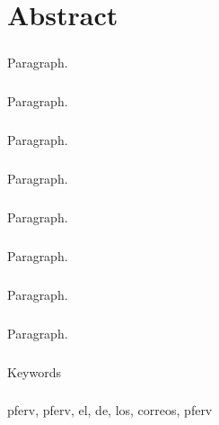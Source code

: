 \chapter*{Abstract}
\label{cha:abstract}
\paragraph{}
Paragraph.

\paragraph{}
Paragraph.

\paragraph{}
Paragraph.

\paragraph{}
Paragraph.

\newpage %

\paragraph{}
Paragraph.

\paragraph{}
Paragraph.

\paragraph{}
Paragraph.


\paragraph{}
Paragraph.

\newpage %
\paragraph{}
{\huge Keywords}
\paragraph{}
pferv, pferv, el, de, los, correos, pferv

\newpage %
